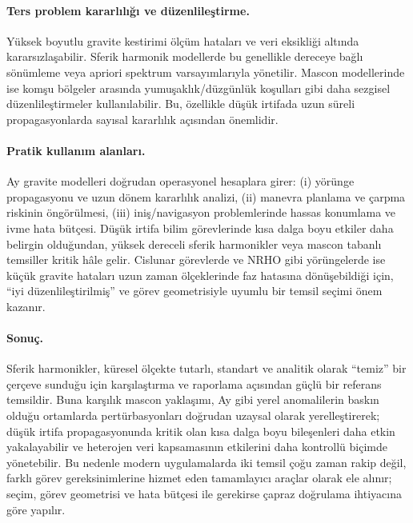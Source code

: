 \paragraph{Ters problem kararlılığı ve düzenlileştirme.}
Yüksek boyutlu gravite kestirimi ölçüm hataları ve veri eksikliği altında kararsızlaşabilir.
Sferik harmonik modellerde bu genellikle dereceye bağlı sönümleme veya apriori spektrum varsayımlarıyla yönetilir.
Mascon modellerinde ise komşu bölgeler arasında yumuşaklık/düzgünlük koşulları gibi daha sezgisel düzenlileştirmeler
kullanılabilir. Bu, özellikle düşük irtifada uzun süreli propagasyonlarda sayısal kararlılık açısından önemlidir.

\paragraph{Pratik kullanım alanları.}
Ay gravite modelleri doğrudan operasyonel hesaplara girer: (i) yörünge propagasyonu ve uzun dönem kararlılık analizi,
(ii) manevra planlama ve çarpma riskinin öngörülmesi, (iii) iniş/navigasyon problemlerinde hassas konumlama ve
ivme hata bütçesi. Düşük irtifa bilim görevlerinde kısa dalga boyu etkiler daha belirgin olduğundan,
yüksek dereceli sferik harmonikler veya mascon tabanlı temsiller kritik hâle gelir.
Cislunar görevlerde ve NRHO gibi yörüngelerde ise küçük gravite hataları uzun zaman ölçeklerinde faz hatasına
dönüşebildiği için, ``iyi düzenlileştirilmiş'' ve görev geometrisiyle uyumlu bir temsil seçimi önem kazanır.

\paragraph{Sonuç.}
Sferik harmonikler, küresel ölçekte tutarlı, standart ve analitik olarak ``temiz'' bir çerçeve sunduğu için
karşılaştırma ve raporlama açısından güçlü bir referans temsildir. Buna karşılık mascon yaklaşımı, Ay gibi yerel anomalilerin
baskın olduğu ortamlarda pertürbasyonları doğrudan uzaysal olarak yerelleştirerek; düşük irtifa propagasyonunda kritik olan
kısa dalga boyu bileşenleri daha etkin yakalayabilir ve heterojen veri kapsamasının etkilerini daha kontrollü biçimde yönetebilir.
Bu nedenle modern uygulamalarda iki temsil çoğu zaman rakip değil, farklı görev gereksinimlerine hizmet eden tamamlayıcı araçlar
olarak ele alınır; seçim, görev geometrisi ve hata bütçesi ile gerekirse çapraz doğrulama ihtiyacına göre yapılır.



